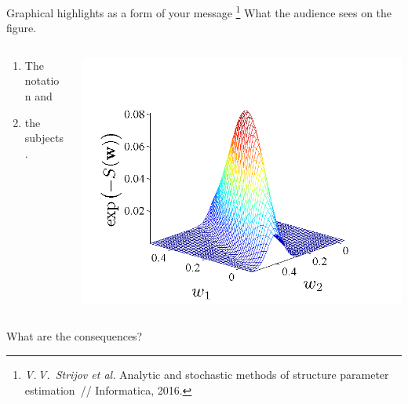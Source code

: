 \documentclass[12pt,pdf,hyperref={unicode}]{beamer}
\begin{document}
\begin{frame}{Graphical highlights  as a form of your message%
\footnote{\textit{V.\,V.~Strijov et al.}  Analytic and stochastic methods of structure parameter estimation~// Informatica, 2016.}}
What the audience sees on the figure.
\begin{columns}
\begin{column}{0.3\textwidth}
\begin{enumerate}[1)]
    \item The notation and 
    \item the subjects.
\end{enumerate}
\end{column}
\begin{column}{0.7\textwidth}
	\includegraphics[width=1\textwidth]{Name-Step-3-fig}      
\end{column}
\end{columns}
\bigskip
What are the consequences?
\end{frame}
\end{document}
